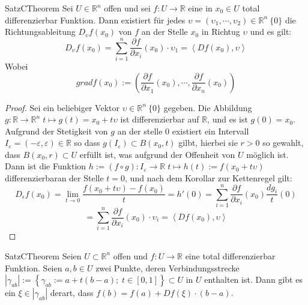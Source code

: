 \begin{ibox}[36]{Satz}{CTheorem}
    Sei $ U \in \mathbb{R}^n  $ offen und sei $ f: U \to \mathbb{R}  $ eine in $ x_0 \in U $ total differenzierbar
	Funktion. Dann existiert für jedes $ \upsilon =  \left( \upsilon_1 , \cdots, \upsilon_2 \right) \in \mathbb{R}^n \ \{0\} $ 
	die Richtungsableitung $ D_{\upsilon}f(x_0) $ von $ f $ an der Stelle $ x_0 $ in Richtug $ \upsilon$ und es gilt:
	$$ D_{\upsilon}f(x_0) = \sum_{i=1}^{n} \frac{\partial f}{\partial x_{i}} (x_0) \cdot \upsilon_1  =
	\left<Df(x_0), \upsilon \right>$$
	Wobei
	$$ grad f(x_0) := \left( \frac{\partial f}{\partial x_1} (x_0)  , \cdots, \frac{\partial f}{\partial x_n} (x_0) \right)$$
\end{ibox}
\begin{proof}
	Sei ein beliebiger Vektor $ \upsilon \in \mathbb{R}^n \ \{0\} $ gegeben. Die Abbildung $ g: \mathbb{R}  \to \mathbb{R}^n 
	 \; t \mapsto g(t) = x_0 + t \upsilon$  ist differenzierbar auf $ \mathbb{R}  $, und es ist $ g(0) = x_0 $. 
	 Aufgrund der Stetigkeit von $ g $ an der stelle $ 0 $ existiert ein Intervall $ I_{\varepsilon} = \left( - \varepsilon 
	 , \varepsilon \right) \in \mathbb{R}  $ so dass $ g \left( I_{ \varepsilon } \right) \subset  B(x_0,t) $ gilbt, hierbei
	 sie $ r > 0 $ so gewahlt, dass $ B(x_0, r) \subset U $ erfüllt ist, was aufgrund der Offenheit von $ U $ möglich ist.
	 Dann ist die Funktion $ h:=(f \circ g): I_{ \varepsilon } \to \mathbb{R} \; t \mapsto h(t) := f(x_0+t \upsilon) $ 
	 differenzierbaran der Stelle $ t = 0 $, und nach dem Korollar zur Kettenregel gilt:
	 $$ D_{\epsilon}f(x_0) = \lim_{t \to 0} \frac{f(x_0+t \upsilon) - f(x_0)}{t} = h'(0) = 
	 \sum_{i = 1}^{n} \frac{\partial f}{\partial x_{i}} (x_0) \frac{dg_{i}}{t}(0) 
	 $$
	  $$ = \sum_{i=1}^{n} \frac{\partial f}{\partial x_{i}} (x_0) \cdot \upsilon_{i} = \left<Df(x_0), \upsilon \right> $$
	   
\end{proof}
\begin{ibox}[37]{Satz}{CTheorem}
    Seien $ U \subset  \mathbb{R}^n  $ offen und $ f: U \to \mathbb{R}  $ eine total differenzierbar Funktion. Seien $ a,b \in U $
	zwei Punkte, deren Verbindungsstrecke $ \left| \gamma_{ab} \right| := \left\{ \gamma_{ab} := a + t(b-a); \; 
	t \in [0,1] \right\} \subset  U \text{ in } U $ enthalten ist. Dann gibt es ein $ \xi \in \left| \gamma_{ab} \right|  $ 
	derart, dass $ f(b) = f(a)+ Df(\xi) \cdot (b-a)  $.
\end{ibox}
